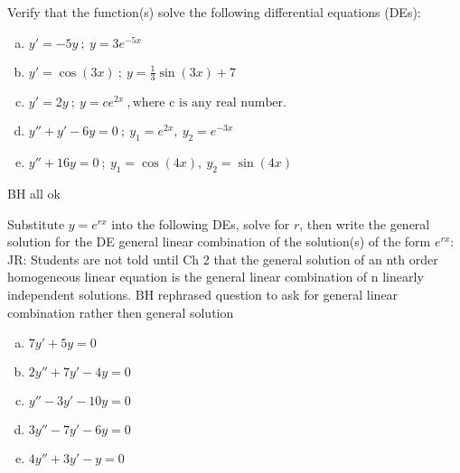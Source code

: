 \documentclass[12pt]{book}
\begin{document}


\begin{exercise}

Verify that the function(s) solve the following differential equations (DEs):
\begin{enumerate}[a)]
    \item $y' = -5y\ ;\ y = 3e^{-5x}$
    \item $y' = \cos(3x)\ ;\ y = \frac{1}{3} \sin(3x) +7$
    \item $y' = 2y\ ;\ y = ce^{2x}\ , \text{where c is any real number.} $
    \item $y''+y'-6y = 0\ ;\ y_1 = e^{2x},\ y_2 = e^{-3x}$
    \item $y''+16y = 0\ ;\ y_1 = \cos(4x),\ y_2 = \sin(4x)$
\end{enumerate}
{\color{teal}BH all ok}
\end{exercise}

\begin{exercise}

Substitute $y = e^{rx}$ into the following DEs, solve for $r$, then write the
{\color{red} general solution for the DE}
{\color{blue} general linear combination of the solution(s) of the form $e^{rx}$:}
{\color{teal}JR: Students are not told until Ch 2 that the general solution of an nth order homogeneous linear equation is the general linear combination of n linearly independent solutions.}
{\color{teal}BH rephrased question to
ask for general linear combination
rather then general solution}
\begin{enumerate}[a)]
    \item $7y'+5y = 0$
    \item $2y'' + 7y' -4y = 0$
    \item $y''-3y'-10y=0$
    \item $3y''-7y'-6y = 0$
    \item $4y''+3y'-y = 0$
\end{enumerate}

\end{exercise}
\end{document}
